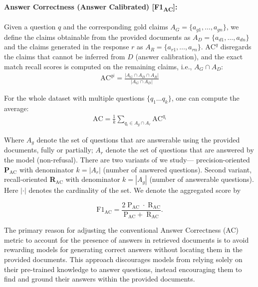 \documentclass{article} %
\begin{document}
\paragraph{Answer Correctness (Answer Calibrated) [F1\textsubscript{AC}]:} 
Given a question \(q\) and the corresponding gold claims \(A_G = \{a_{g1}, \ldots, a_{gn}\}\), we define the claims obtainable from the provided documents as \(A_D = \{a_{d1}, \ldots, a_{dn}\}\) and the claims generated in the response \(r\) as \(A_R = \{a_{r1}, \ldots, a_{rn}\}\). $\text{AC}^{q}$ disregards the claims that cannot be inferred from $D$ (answer calibration), and the exact match recall scores is computed on the remaining claims, i.e., \(A_G \cap A_D\):
%
\begin{align}
    \text{AC}^{qi} = \frac{|A_G \cap A_D \cap A_R|}{|A_G \cap A_D|}
    \label{eqn:em_q_ac}
\end{align}

For the whole dataset with multiple questions $\{q_1 \ldots q_k\}$, one can compute the average:
%
\begin{align}
    \text{AC} = \frac{1}{k} \sum_{q_i \in  {A_g \cap A_r}}\text{AC}^{q_i}
    \label{eqn:em_ac}
\end{align}

Where $A_g$ denote the set of questions that are answerable using the provided documents, fully or partially; $A_r$ denote the set of questions that are answered by the model (non-refusal).  There are two variants of  we study--- precision-oriented \textbf{P$_{\text{AC}}$} with denominator $k=|A_r|$ (number of answered questions). Second variant, recall-oriented \textbf{R$_{\text{AC}}$} with denominator $k=|A_g|$ (number of answerable questions). Here $|\cdot|$ denotes the cardinality of the set. We denote the aggregated score by 

\begin{equation}
    \text{F1}_{\text{AC}}= \frac{2\; \text{P$_{\text{AC}}$} \;\cdot\; \text{R$_{\text{AC}}$}}{\text{P$_{\text{AC}}$} +\; \text{R$_{\text{AC}}$}}.
\end{equation}

The primary reason for adjusting the conventional Answer Correctness (AC) metric to account for the presence of answers in retrieved documents is to avoid rewarding models for generating correct answers without locating them in the provided documents. This approach discourages models from relying solely on their pre-trained knowledge to answer questions, instead encouraging them to find and ground their answers within the provided documents.
\end{document}
